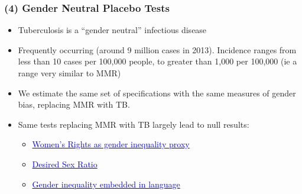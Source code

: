 \documentclass[10pt,letterpaper,subeqn]{beamer}
\begin{document}


\begin{frame}

\end{frame}





\begin{frame}[label=placebos]
\frametitle{(4) Gender Neutral Placebo Tests}
\begin{itemize}
\setlength{\itemsep}{10pt}
  \item Tuberculosis is a ``gender neutral'' infectious disease
  \item Frequently occurring (around 9 million cases in 2013). Incidence ranges
        from less than 10 cases per 100,000 people, to greater than 1,000 per
        100,000 (ie a range very similar to MMR)
  \item We estimate the same set of specifications with the same measures of
        gender bias, replacing MMR with TB.
  \item Same tests replacing MMR with TB largely lead to null results:
  \begin{itemize}
    \item \hyperlink{placebo1}{\textcolor{blue}{Women's Rights as gender
                                                inequality proxy}}
    \item \hyperlink{placebo2}{\textcolor{blue}{Desired Sex Ratio}}
    \item \hyperlink{placebo3}{\textcolor{blue}{Gender inequality embedded in
                                                language}}
  \end{itemize}
\end{itemize}
\end{frame}
\end{document}
